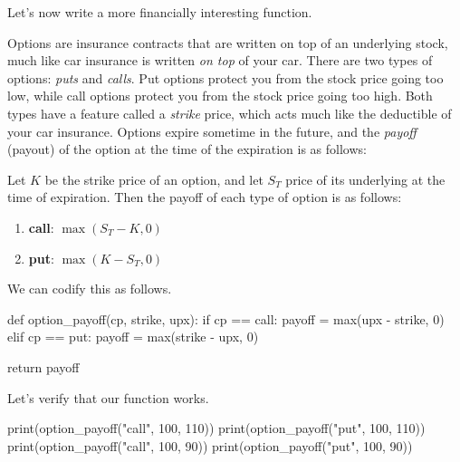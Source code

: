 \documentclass[
  letterpaper,
  DIV=11,
  numbers=noendperiod]{scrreprt}
\newenvironment{Shaded}{\begin{snugshade}}{\end{snugshade}}
\newcommand{\BuiltInTok}[1]{\textcolor[rgb]{0.00,0.23,0.31}{#1}}
\newcommand{\ControlFlowTok}[1]{\textcolor[rgb]{0.00,0.23,0.31}{#1}}
\newcommand{\DecValTok}[1]{\textcolor[rgb]{0.68,0.00,0.00}{#1}}
\newcommand{\KeywordTok}[1]{\textcolor[rgb]{0.00,0.23,0.31}{#1}}
\newcommand{\NormalTok}[1]{\textcolor[rgb]{0.00,0.23,0.31}{#1}}
\newcommand{\OperatorTok}[1]{\textcolor[rgb]{0.37,0.37,0.37}{#1}}
\newcommand{\StringTok}[1]{\textcolor[rgb]{0.13,0.47,0.30}{#1}}
\begin{document}
Let's now write a more financially interesting function.

Options are insurance contracts that are written on top of an underlying
stock, much like car insurance is written \emph{on top} of your car.
There are two types of options: \emph{puts} and \emph{calls}. Put
options protect you from the stock price going too low, while call
options protect you from the stock price going too high. Both types have
a feature called a \emph{strike} price, which acts much like the
deductible of your car insurance. Options expire sometime in the future,
and the \emph{payoff} (payout) of the option at the time of the
expiration is as follows:

Let \(K\) be the strike price of an option, and let \(S_{T}\) price of
its underlying at the time of expiration. Then the payoff of each type
of option is as follows:

\begin{enumerate}
\def\labelenumi{\arabic{enumi}.}
\item
  \textbf{call}: \(\max(S_T - K, 0)\)
\item
  \textbf{put}: \(\max(K - S_T, 0)\)
\end{enumerate}

We can codify this as follows.

\begin{Shaded}
\begin{Highlighting}[]
\KeywordTok{def}\NormalTok{ option\_payoff(cp, strike, upx):}
    \ControlFlowTok{if}\NormalTok{ cp }\OperatorTok{==} \StringTok{\textquotesingle{}call\textquotesingle{}}\NormalTok{:}
\NormalTok{        payoff }\OperatorTok{=} \BuiltInTok{max}\NormalTok{(upx }\OperatorTok{{-}}\NormalTok{ strike, }\DecValTok{0}\NormalTok{)}
    \ControlFlowTok{elif}\NormalTok{ cp }\OperatorTok{==} \StringTok{\textquotesingle{}put\textquotesingle{}}\NormalTok{:}
\NormalTok{        payoff }\OperatorTok{=} \BuiltInTok{max}\NormalTok{(strike }\OperatorTok{{-}}\NormalTok{ upx, }\DecValTok{0}\NormalTok{)}
    
    \ControlFlowTok{return}\NormalTok{ payoff}
\end{Highlighting}
\end{Shaded}

Let's verify that our function works.

\begin{Shaded}
\begin{Highlighting}[]
\BuiltInTok{print}\NormalTok{(option\_payoff(}\StringTok{"call"}\NormalTok{, }\DecValTok{100}\NormalTok{, }\DecValTok{110}\NormalTok{))}
\BuiltInTok{print}\NormalTok{(option\_payoff(}\StringTok{"put"}\NormalTok{, }\DecValTok{100}\NormalTok{, }\DecValTok{110}\NormalTok{))}
\BuiltInTok{print}\NormalTok{(option\_payoff(}\StringTok{"call"}\NormalTok{, }\DecValTok{100}\NormalTok{, }\DecValTok{90}\NormalTok{))}
\BuiltInTok{print}\NormalTok{(option\_payoff(}\StringTok{"put"}\NormalTok{, }\DecValTok{100}\NormalTok{, }\DecValTok{90}\NormalTok{))}
\end{Highlighting}
\end{Shaded}
\end{document}
